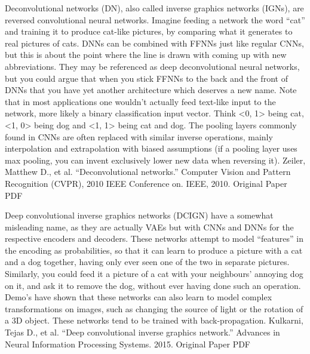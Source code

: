 \documentclass[11pt,a4paper,oneside]{ctexbook}
\begin{document}
Deconvolutional networks (DN), also called inverse graphics networks (IGNs), are reversed convolutional neural networks. Imagine feeding a network the word “cat” and training it to produce cat-like pictures, by comparing what it generates to real pictures of cats. DNNs can be combined with FFNNs just like regular CNNs, but this is about the point where the line is drawn with coming up with new abbreviations. They may be referenced as deep deconvolutional neural networks, but you could argue that when you stick FFNNs to the back and the front of DNNs that you have yet another architecture which deserves a new name. Note that in most applications one wouldn’t actually feed text-like input to the network, more likely a binary classification input vector. Think <0, 1> being cat, <1, 0> being dog and <1, 1> being cat and dog. The pooling layers commonly found in CNNs are often replaced with similar inverse operations, mainly interpolation and extrapolation with biased assumptions (if a pooling layer uses max pooling, you can invent exclusively lower new data when reversing it).
Zeiler, Matthew D., et al. “Deconvolutional networks.” Computer Vision and Pattern Recognition (CVPR), 2010 IEEE Conference on. IEEE, 2010.
Original Paper PDF


Deep convolutional inverse graphics networks (DCIGN) have a somewhat misleading name, as they are actually VAEs but with CNNs and DNNs for the respective encoders and decoders. These networks attempt to model “features” in the encoding as probabilities, so that it can learn to produce a picture with a cat and a dog together, having only ever seen one of the two in separate pictures. Similarly, you could feed it a picture of a cat with your neighbours’ annoying dog on it, and ask it to remove the dog, without ever having done such an operation. Demo’s have shown that these networks can also learn to model complex transformations on images, such as changing the source of light or the rotation of a 3D object. These networks tend to be trained with back-propagation.
Kulkarni, Tejas D., et al. “Deep convolutional inverse graphics network.” Advances in Neural Information Processing Systems. 2015.
Original Paper PDF
\end{document}
